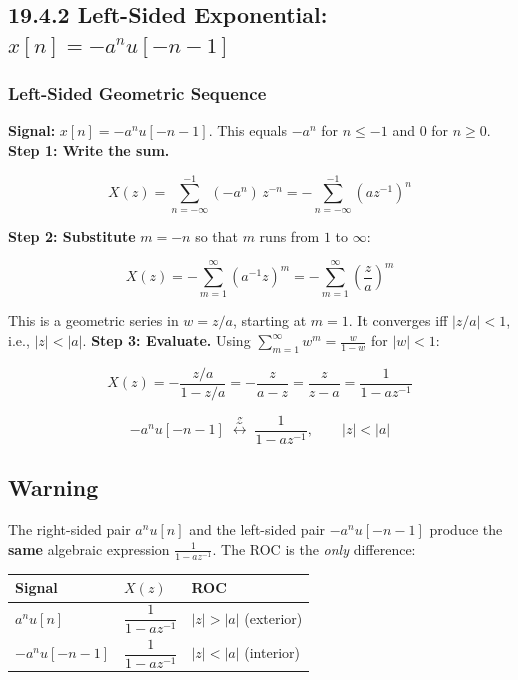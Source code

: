 \documentclass[11pt]{article}
\begin{document}
\subsection*{19.4.2 Left-Sided Exponential: $x[n] = -a^n u[-n-1]$}

\subsubsection*{Left-Sided Geometric Sequence}

\textbf{Signal:} $x[n] = -a^n u[-n-1]$. This equals $-a^n$ for $n \leq -1$ and $0$ for $n \geq 0$.
\textbf{Step 1: Write the sum.}

\[X(z) = \sum_{n=-\infty}^{-1} (-a^n)\, z^{-n} = -\sum_{n=-\infty}^{-1} (az^{-1})^n\]

\textbf{Step 2: Substitute} $m = -n$ so that $m$ runs from $1$ to $\infty$:

\[X(z) = -\sum_{m=1}^{\infty} (a^{-1} z)^m = -\sum_{m=1}^{\infty} \left(\frac{z}{a}\right)^m\]

This is a geometric series in $w = z/a$, starting at $m = 1$. It converges iff $|z/a| < 1$, i.e., $|z| < |a|$.
\textbf{Step 3: Evaluate.} Using $\sum_{m=1}^{\infty} w^m = \frac{w}{1-w}$ for $|w| < 1$:

\[X(z) = -\frac{z/a}{1 - z/a} = -\frac{z}{a - z} = \frac{z}{z - a} = \frac{1}{1 - az^{-1}}\]

\[\boxed{-a^n u[-n-1] \;\overset{\mathcal{Z}}{\longleftrightarrow}\; \frac{1}{1 - az^{-1}}, \qquad |z| < |a|}\]

\subsection*{Warning}

The right-sided pair $a^n u[n]$ and the left-sided pair $-a^n u[-n-1]$ produce the \textbf{same} algebraic expression $\frac{1}{1-az^{-1}}$. The ROC is the \textit{only} difference:

\begin{center}
\begin{tabular}{|l|l|l|}
\hline
\textbf{Signal} & \textbf{$X(z)$} & \textbf{ROC} \\
\hline
$a^n u[n]$ & $\dfrac{1}{1 - az^{-1}}$ & $|z| > |a|$ (exterior) \\
\hline
$-a^n u[-n-1]$ & $\dfrac{1}{1 - az^{-1}}$ & $|z| < |a|$ (interior) \\
\hline
\end{tabular}
\end{center}
\end{document}
